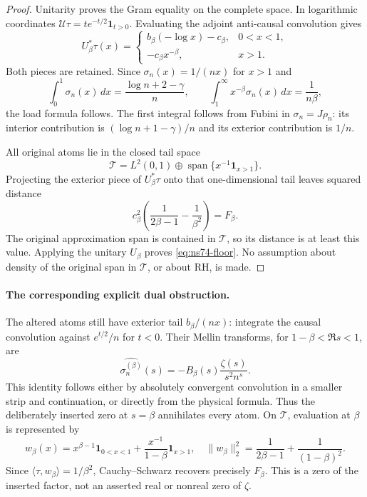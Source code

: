\begin{proof}
Unitarity proves the Gram equality on the complete space. In logarithmic
coordinates $\mathcal U\tau=t e^{-t/2}\mathbf1_{t>0}$.
Evaluating the adjoint anti-causal convolution gives
\[
 U_\beta^*\tau(x)=
 \begin{cases}
 b_\beta(-\log x)-c_\beta,&0<x<1,\\
 -c_\beta x^{-\beta},&x>1.
 \end{cases}
\]
Both pieces are retained. Since $\sigma_n(x)=1/(nx)$ for $x>1$ and
\[
 \int_0^1\sigma_n(x)\,dx=\frac{\log n+2-\gamma}{n},
 \qquad \int_1^\infty x^{-\beta}\sigma_n(x)\,dx=\frac1{n\beta},
\]
the load formula follows. The first integral follows from Fubini in
$\sigma_n=J\rho_n$: its interior contribution is
$(\log n+1-\gamma)/n$ and its exterior contribution is $1/n$.

All original atoms lie in the closed tail space
\[
 \mathcal T=L^2(0,1)\oplus
              \operatorname{span}\{x^{-1}\mathbf1_{x>1}\}.
\]
Projecting the exterior piece of $U_\beta^*\tau$ onto that one-dimensional
tail leaves squared distance
\[
 c_\beta^2\left(\frac1{2\beta-1}-\frac1{\beta^2}\right)
 =F_\beta.
\]
The original approximation span is contained in $\mathcal T$, so its
distance is at least this value. Applying the unitary $U_\beta$ proves
\eqref{eq:ns74-floor}. No assumption about density of the original span
in $\mathcal T$, or about RH, is made.
\end{proof}

\paragraph{The corresponding explicit dual obstruction.}
The altered atoms still have exterior tail $b_\beta/(nx)$: integrate the
causal convolution against $e^{t/2}/n$ for $t<0$.
Their Mellin transforms, for $1-\beta<\Re s<1$, are
\[
 \widehat{\sigma_n^{(\beta)}}(s)
     =-B_\beta(s)\frac{\zeta(s)}{s^2n^s}.
\]
This identity follows either by absolutely convergent convolution in a
smaller strip and continuation, or directly from the physical formula.
Thus the deliberately inserted zero at $s=\beta$ annihilates every atom.
On $\mathcal T$, evaluation at $\beta$ is represented by
\[
 w_\beta(x)=x^{\beta-1}\mathbf1_{0<x<1}
          +\frac{x^{-1}}{1-\beta}\mathbf1_{x>1},
 \quad
 \|w_\beta\|_2^2=\frac1{2\beta-1}+\frac1{(1-\beta)^2}.
\]
Since $\langle\tau,w_\beta\rangle=1/\beta^2$, Cauchy--Schwarz
recovers precisely $F_\beta$. This is a zero of the inserted factor,
not an asserted real or nonreal zero of $\zeta$.

